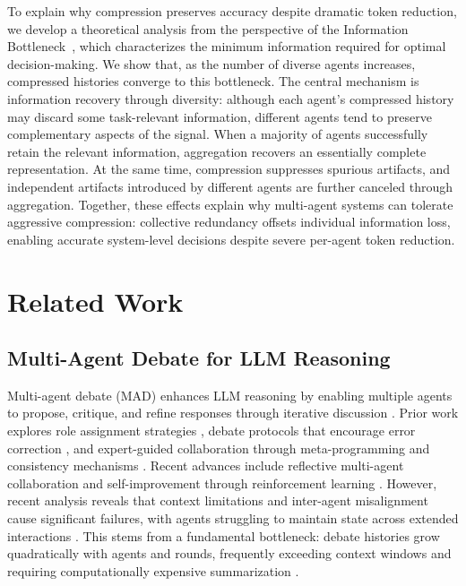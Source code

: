 \documentclass{article}
\theoremstyle{plain}
\theoremstyle{definition}
\theoremstyle{remark}
\begin{document}
To explain why compression preserves accuracy despite dramatic token reduction, we develop a theoretical analysis from the perspective of the Information Bottleneck~\cite{kawaguchi2023does}, which characterizes the minimum information required for optimal decision-making. We show that, as the number of diverse agents increases, compressed histories converge to this bottleneck. The central mechanism is information recovery through diversity: although each agent’s compressed history may discard some task-relevant information, different agents tend to preserve complementary aspects of the signal. When a majority of agents successfully retain the relevant information, aggregation recovers an essentially complete representation. At the same time, compression suppresses spurious artifacts, and independent artifacts introduced by different agents are further canceled through aggregation. Together, these effects explain why multi-agent systems can tolerate aggressive compression: collective redundancy offsets individual information loss, enabling accurate system-level decisions despite severe per-agent token reduction.


\section{Related Work}
\label{Related}

\subsection{Multi-Agent Debate for LLM Reasoning}
Multi-agent debate (MAD) enhances LLM reasoning by enabling multiple agents to propose, critique, and refine responses through iterative discussion \cite{du2023improving, liang2023encouraging, chan2023chateval}. Prior work explores role assignment strategies \cite{wang2023unleashing}, debate protocols that encourage error correction \cite{khan2024debating, liu2025breaking}, and expert-guided collaboration through meta-programming and consistency mechanisms \cite{hong2023metagpt, xiong2023examining, pham2023let}. Recent advances include reflective multi-agent collaboration \cite{bo2024reflective} and self-improvement through reinforcement learning \cite{chen2024self, subramaniam2025multiagent}. However, recent analysis reveals that context limitations and inter-agent misalignment cause significant failures, with agents struggling to maintain state across extended interactions \cite{cemri2025multi}. This stems from a fundamental bottleneck: debate histories grow quadratically with agents and rounds, frequently exceeding context windows and requiring computationally expensive summarization \cite{chen2024reconcile, wu2025unfixing}.
\end{document}
